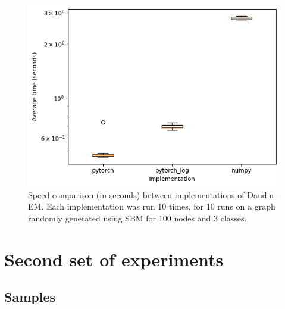 \documentclass[switch, 12pt]{article}
\begin{document}
\begin{figure}[h]
    \centering
    \includegraphics[width=0.5\linewidth]{figures/speed_comparison_VEM.png}
    \caption{Speed comparison (in seconds) between implementations of Daudin-EM. Each implementation was run 10 times, for 10 runs on a graph randomly generated using SBM for 100 nodes and 3 classes.}
    \label{fig:speed_comparison}
\end{figure}

\newpage

\section{Second set of experiments}
\label{app:sbm}

\subsection{Samples}

\hphantom{.}  %
\end{document}
